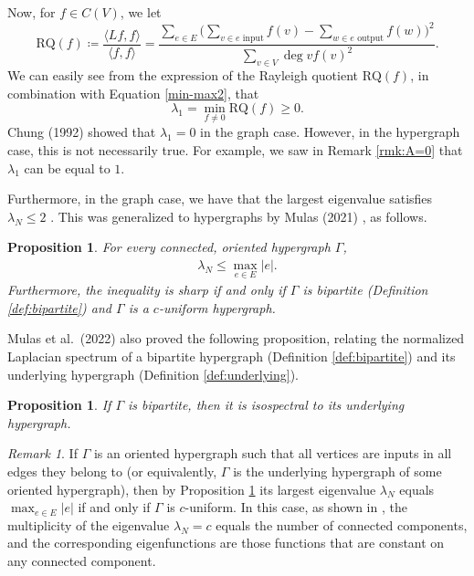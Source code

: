 \documentclass{article}
\newcommand{\RQ}{\textrm{RQ}}
\theoremstyle{plain}
\newtheorem{proposition}[theorem]{Proposition}
\theoremstyle{definition}
\theoremstyle{remark}
\newtheorem{remark}[theorem]{Remark}
\begin{document}
Now, for $f\in C(V)$, we let
\begin{equation*}
    \RQ(f) \coloneqq \frac{\langle Lf,f\rangle}{\langle f,f \rangle} = \frac{\sum_{e\in E}\biggl(\sum_{v\in e \text{ input}} f(v) - \sum_{w\in e \text{ output}}f(w)\biggr)^2}{\sum_{v\in V}\deg v f(v)^2}.
\end{equation*}
We can easily see from the expression of the Rayleigh quotient $\RQ(f)$, in combination with Equation \eqref{min-max2}, that
\[
\lambda_1 = \min_{f\neq 0}\RQ(f) \geq 0.
\]
Chung (1992) \cite{chung} showed that $\lambda_1=0$ in the graph case. However, in the hypergraph case, this is not necessarily true. For example, we saw in Remark \ref{rmk:A=0} that $\lambda_1$ can be equal to $1$.

Furthermore, in the graph case, we have that the largest eigenvalue satisfies $\lambda_N \leq 2$ \cite{chung}. This was generalized to hypergraphs by Mulas (2021) \cite{Mulas2021}, as follows.
\begin{proposition}\label{prop:eigenvalues}
    For every connected, oriented hypergraph $\Gamma$,
    \begin{align*}
        \lambda_N \leq \max_{e\in E}|e|.
    \end{align*}
    Furthermore, the inequality is sharp if and only if $\Gamma$ is bipartite (Definition \ref{def:bipartite}) and $\Gamma$ is a $c$-uniform hypergraph.
\end{proposition}
Mulas et al.\ (2022) \cite{mulas2022hypergraphs} also proved the following proposition, relating the normalized Laplacian spectrum of a bipartite hypergraph (Definition \ref{def:bipartite}) and its underlying hypergraph (Definition \ref{def:underlying}).
\begin{proposition}%
    If $\Gamma$ is bipartite, then it is isospectral to its underlying hypergraph.
\end{proposition}
\begin{remark}\label{rmk:lambdaN=c}
    If $\Gamma$ is an oriented hypergraph such that all vertices are inputs in all edges they belong to (or equivalently, $\Gamma$ is the underlying hypergraph of some oriented hypergraph), then by Proposition \ref{prop:eigenvalues} its largest eigenvalue $\lambda_N$ equals $\max_{e\in E}|e|$ if and only if $\Gamma$ is $c$-uniform. In this case, as shown in \cite{Mulas2021}, the multiplicity of the eigenvalue $\lambda_N=c$ equals the number of connected components, and the corresponding eigenfunctions are those functions that are constant on any connected component.
\end{remark}
\end{document}

